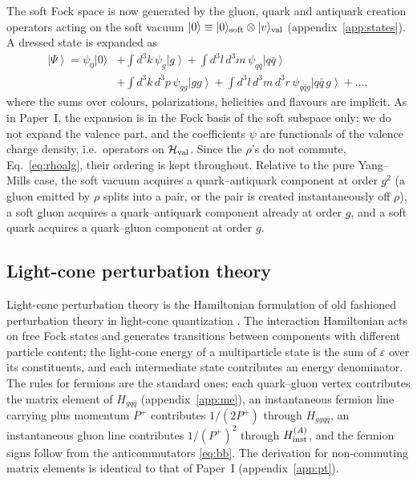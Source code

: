 \documentclass[11pt,a4paper]{article}
\numberwithin{equation}{section}
\newcommand{\eps}{\varepsilon}
\newcommand{\ket}[1]{\left|#1\right\rangle}
\newcommand{\vac}{|0\rangle}
\begin{document}
The soft Fock space is now generated by the gluon, quark and antiquark creation operators acting
on the soft vacuum $\vac\equiv\vac_{\rm soft}\otimes|v\rangle_{\rm val}$ (appendix~\ref{app:states}).
A dressed state is expanded as
\begin{align}
\ket{\Psi}=\psi_{0}\vac&+\int\!d^{3}k\,\psi_{g}\ket{g}+\int\!d^{3}l\,d^{3}m\,\psi_{q\bar q}\ket{q\bar q}
\nonumber\\
&+\int\!d^{3}k\,d^{3}p\,\psi_{gg}\ket{gg}+\int\!d^{3}l\,d^{3}m\,d^{3}r\,\psi_{q\bar qg}\ket{q\bar q\,g}+\dots,
\label{eq:fock}
\end{align}
where the sums over colours, polarizations, helicities and flavours are implicit. As in Paper~I,
the expansion is in the Fock basis of the soft subspace only: we do not expand the valence part,
and the coefficients $\psi$ are functionals of the valence charge density, i.e.\ operators on
$\mathcal H_{\rm val}$. Since the $\rho$'s do not commute, Eq.~\eqref{eq:rhoalg}, their ordering
is kept throughout. Relative to the pure Yang--Mills case, the soft vacuum acquires a
quark--antiquark component at order $g^{2}$ (a gluon emitted by $\rho$ splits into a pair, or the
pair is created instantaneously off $\rho$), a soft gluon acquires a quark--antiquark component
already at order $g$, and a soft quark acquires a quark--gluon component at order $g$.

\subsection{Light-cone perturbation theory}
\label{sec:lcpt}

Light-cone perturbation theory is the Hamiltonian formulation of old fashioned perturbation
theory in light-cone quantization \cite{Lepage:1980fj,Brodsky:1997de,Kogut:1969xa}. The
interaction Hamiltonian acts on free Fock states and generates transitions between components
with different particle content; the light-cone energy of a multiparticle state is the sum of
$\eps$ over its constituents, and each intermediate state contributes an energy denominator. The
rules for fermions are the standard ones: each quark--gluon vertex contributes the matrix element
of $H_{gq\bar q}$ (appendix~\ref{app:me}), an instantaneous fermion line carrying plus momentum
$P^{+}$ contributes $1/(2P^{+})$ through $H_{ggq\bar q}$, an instantaneous gluon line contributes
$1/(P^{+})^{2}$ through $H^{(A)}_{\rm inst}$, and the fermion signs follow from the
anticommutators \eqref{eq:bb}. The derivation for non-commuting matrix elements is identical to
that of Paper~I (appendix~\ref{app:pt}).
\end{document}
